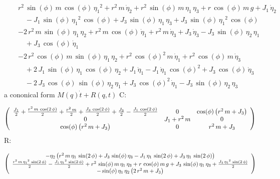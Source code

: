 \begin{eqnarray*} && r^2\,\sin(\phi)\,m\,\cos(\phi)\,{{\eta_{1}}}^2 + 
r^2\,m\,{\dot{\eta}_{2}} + r^2\,\sin(\phi)\,m\,{\eta_{1}}\,{\eta_{3}}
 + r\,\cos(\phi)\,m\,g + J_{1}\,{\dot{\eta}_{2}} \\ &&\quad\mbox{} - J
_{1}\,\sin(\phi)\,{{\eta_{1}}}^2\,\cos(\phi) + J_{3}\,\sin(\phi)\,{
\eta_{1}}\,{\eta_{3}} + J_{3}\,\sin(\phi)\,{{\eta_{1}}}^2\,\cos(\phi)
 \end{eqnarray*}
\begin{eqnarray*} && -2\,r^2\,m\,\sin(\phi)\,{\eta_{1}}\,{\eta_{2}} + 
r^2\,m\,\cos(\phi)\,{\dot{\eta}_{1}} + r^2\,m\,{\dot{\eta}_{3}} + J_{3
}\,{\dot{\eta}_{3}} - J_{3}\,\sin(\phi)\,{\eta_{2}}\,{\eta_{1}}
 \\ &&\quad\mbox{} + J_{3}\,\cos(\phi)\,{\dot{\eta}_{1}}
 \end{eqnarray*}
\begin{eqnarray*} && -2\,r^2\,\cos(\phi)\,m\,\sin(\phi)\,{\eta_{1}}\,{
\eta_{2}} + r^2\,{\cos(\phi)}^2\,m\,{\dot{\eta}_{1}} + r^2\,\cos(\phi)
\,m\,{\dot{\eta}_{3}} \\ &&\quad\mbox{} + 2\,J_{1}\,\sin(\phi)\,{\eta
_{1}}\,\cos(\phi)\,{\eta_{2}} + J_{1}\,{\dot{\eta}_{1}} - J_{1}\,{
\dot{\eta}_{1}}\,{\cos(\phi)}^2 + J_{3}\,\cos(\phi)\,{\dot{\eta}_{3}}
 \\ &&\quad\mbox{} - 2\,J_{3}\,\cos(\phi)\,\sin(\phi)\,{\eta_{2}}\,{
\eta_{1}} + J_{3}\,{\cos(\phi)}^2\,{\dot{\eta}_{1}} - J_{3}\,\sin(\phi
)\,{\eta_{2}}\,{\eta_{3}} \end{eqnarray*}
a cononical form $M(q)\dot{t}+R(q,t)$
C:
 
$$ \left( \begin{array}{ccc} \frac{J_{1}}{2}+\frac{r^2\,m\,\cos(2\,
\phi)}{2}+\frac{r^2\,m}{2}+\frac{J_{3}\,\cos(2\,\phi)}{2}+\frac{J_{3}
}{2}-\frac{J_{1}\,\cos(2\,\phi)}{2} & 0 & \cos(\phi)\left(r^2\,m+J_{3}
\right) \cr 0 & J_{1}+r^2\,m & 0 \cr \cos(\phi)\left(r^2\,m+J_{3}
\right) & 0 & r^2\,m+J_{3} \end{array} \right) $$
R:
 
$$ \left( \begin{array}{c} -{\eta_{2}}\left(r^2\,m\,{\eta_{1}}\,\sin(2
\,\phi)+J_{3}\,\sin(\phi)\,{\eta_{3}}-J_{1}\,{\eta_{1}}\,\sin(2\,\phi)
+J_{3}\,{\eta_{1}}\,\sin(2\,\phi)\right) \cr \frac{r^2\,m\,{{\eta_{1}}
}^2\,\sin(2\,\phi)}{2}-\frac{J_{1}\,{{\eta_{1}}}^2\,\sin(2\,\phi)}{2}+
r^2\,\sin(\phi)\,m\,{\eta_{1}}\,{\eta_{3}}+r\,\cos(\phi)\,m\,g+J_{3}\,
\sin(\phi)\,{\eta_{1}}\,{\eta_{3}}+\frac{J_{3}\,{{\eta_{1}}}^2\,\sin(2
\,\phi)}{2} \cr -\sin(\phi)\,{\eta_{1}}\,{\eta_{2}}\left(2\,r^2\,m+J_{
3}\right) \end{array} \right) $$
